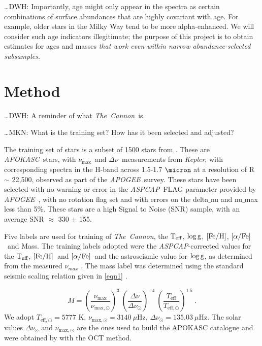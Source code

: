 \documentclass[12pt, preprint]{aastex}
\newcommand{\project}[1]{\textsl{#1}}
\newcommand{\thecannon}{\project{The~Cannon}}
\newcommand{\tc}{\project{The~Cannon}}
\newcommand{\apogee}{\project{APOGEE}}
\newcommand{\apokasc}{\project{APOKASC}}
\newcommand{\aspcap}{\project{ASPCAP}}
\newcommand{\kepler}{\project{Kepler}}
\newcommand{\teff}{\mbox{$\rm T_{eff}$}}
\newcommand{\feh}{\mbox{$\rm [Fe/H]$}}
\newcommand{\alphafe}{\mbox{$\rm [\alpha/Fe]$}}
\newcommand{\logg}{\mbox{$\rm \log g$}}
\newcommand{\numax}{$\nu_{\max}$}
\newcommand{\deltanu}{$\Delta\nu$}
\begin{document}
\ldots DWH: Importantly, age might only appear in the spectra as
certain combinations of surface abundances that are highly covariant
with age.  For example, older stars in the Milky Way tend to be more
alpha-enhanced.  We will consider such age indicators illegitimate;
the purpose of this project is to obtain estimates for ages and masses
\emph{that work even within narrow abundance-selected subsamples}.

\section{Method}

\ldots DWH: A reminder of what \thecannon\ is.

\ldots MKN: What is the training set?  How has it been selected and adjusted?

The training set of stars is a subset of 1500 stars from \citet{Martig2015}. These are \apokasc\ stars, with \numax\ and \deltanu\ measurements from \kepler, with corresponding spectra in the H-band across 1.5-1.7 $\micron$ at a resolution of R $\sim$ 22,500, observed as part of the \apogee\ survey. These stars have been selected with no warning or error in the \aspcap\ FLAG parameter provided by \apogee\ \citep{Ahn2014}, with no rotation flag set and with errors on the delta$\_$nu and nu$\_$max less than 5\%. These stars are a high Signal to Noise (SNR) sample, with an average SNR $\approx$ 330 $\pm$ 155. 

Five labels are used for training of \tc, the \teff, \logg, \feh, \alphafe\ and Mass. The training labels adopted were the \aspcap-corrected \citep{Meszaros2013} values for the \teff, \feh\ and \alphafe\ and the astroseismic value for \logg, as determined from the measured $\nu_{max}$ . The mass label was determined using the standard seismic scaling relation given in \ref{eqn1} \citep{SilvaAguirre2011,Chaplin2011}.

\begin{equation} \label{eq:mass}
M= \left( \frac{\nu_{\mathrm{max}}}{\nu_{\mathrm{max,\odot}}}\right)^3\  \left( \frac{\Delta \nu}{\Delta \nu_{\odot}}\right)^{-4} \ \left( \frac{T_{\mathrm{eff}}}{T_{\mathrm{eff,\odot}}}\right)^{1.5} \ .
\label{eq1}
\end{equation}
We adopt  $T_{\mathrm{eff,\odot}}=5777$ K, $\nu_{\mathrm{max,\odot}}=3140\ \mu$Hz, $\Delta \nu_{\odot}=135.03\ \mu$Hz. The solar values  $\Delta \nu_{\odot}$ and $\nu_{\mathrm{max,\odot}}$ are the ones used to build the APOKASC catalogue and were obtained by \cite{Hekker2013} with the OCT method. 
\end{document}
